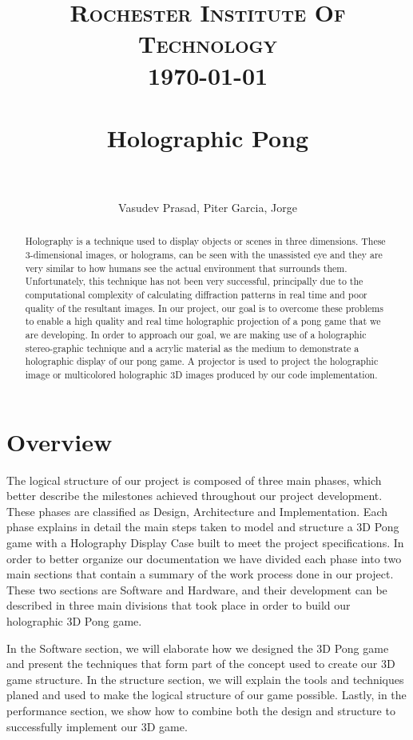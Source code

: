 \documentclass{sig-alternate}
\title{
		\vspace{-0.4in} 	
		\normalfont \normalsize \textsc{Rochester Institute Of Technology} \\ [15pt]
		\today\\
		\horrule{0.5pt} \\[0.4cm]
		\huge Holographic Pong \\
		\horrule{0.5pt} \\[0.4cm]
		\normalsize\vspace{-0.5in}
}
\author{
		\normalfont 
        Vasudev Prasad, Piter Garcia, Jorge 
        \\[6pt]\normalsize
}
\begin{document}
\maketitle

\begin{abstract}

Holography is a technique used to display objects or scenes in three dimensions. These 3-dimensional images, or holograms, can be seen with the unassisted eye and they are very similar to how humans see the actual environment that surrounds them. Unfortunately, this technique has not been very successful, principally due to the computational complexity of calculating diffraction patterns in real time and poor quality of the resultant images. In our project, our goal is to overcome these problems to enable a high quality and real time holographic projection of a pong game that we are developing. In order to approach our goal, we are making use of a holographic stereo-graphic technique and a acrylic material as the medium to demonstrate a holographic display of our pong game. A projector is used to project the holographic image or multicolored holographic 3D images produced by our code implementation. 

\end{abstract}

\section{Overview}
\label{overview}

	The logical structure of our project is composed of three main phases, which better describe the milestones achieved throughout our project development. These phases are classified as Design, Architecture and Implementation. Each phase explains in detail the main steps taken to model and structure a 3D Pong game with a Holography Display Case built to meet the project specifications. In order to better organize our documentation we have divided each phase into two main sections that contain a summary of the work process done in our project. These two sections are Software and Hardware, and their development can be described in three main divisions that took place in order to build our holographic 3D Pong game. 
	\newline
	
	In the Software section, we will elaborate how we designed the 3D Pong game and present the techniques that form part of the concept used to create our 3D game structure. In the structure section, we will explain the tools and techniques planed and used to make the logical structure of our game possible. Lastly, in the performance section, we show how to combine both the design and structure to successfully implement our 3D game.
	\newline
	
\end{document}
